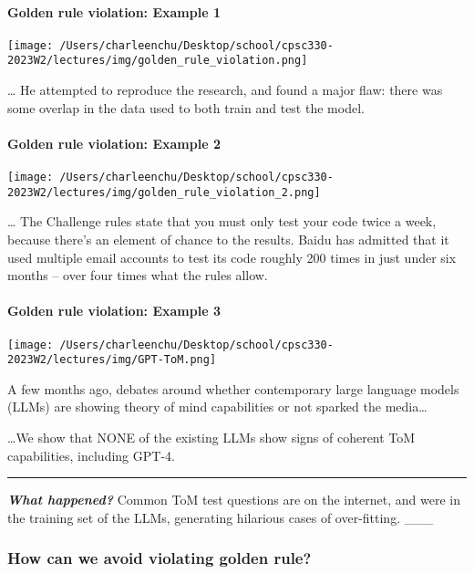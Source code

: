 \documentclass[11pt]{article}
\begin{document}
    \paragraph{Golden rule violation: Example
1}\label{golden-rule-violation-example-1}

\texttt{[image: /Users/charleenchu/Desktop/school/cpsc330-2023W2/lectures/img/golden\_rule\_violation.png]}

\ldots{} He attempted to reproduce the research, and found a major flaw:
there was some overlap in the data used to both train and test the
model.

    \paragraph{Golden rule violation: Example
2}\label{golden-rule-violation-example-2}

\texttt{[image: /Users/charleenchu/Desktop/school/cpsc330-2023W2/lectures/img/golden\_rule\_violation\_2.png]}

\ldots{} The Challenge rules state that you must only test your code
twice a week, because there's an element of chance to the results. Baidu
has admitted that it used multiple email accounts to test its code
roughly 200 times in just under six months -- over four times what the
rules allow.

    \paragraph{Golden rule violation: Example
3}\label{golden-rule-violation-example-3}

\texttt{[image: /Users/charleenchu/Desktop/school/cpsc330-2023W2/lectures/img/GPT-ToM.png]}

A few months ago, debates around whether contemporary large language
models (LLMs) are showing theory of mind capabilities or not sparked the
media\ldots{}

\ldots We show that NONE of the existing LLMs show signs of coherent ToM
capabilities, including GPT-4.

\begin{center}\rule{0.5\linewidth}{0.5pt}\end{center}

\textbf{\emph{What happened?}} Common ToM test questions are on the
internet, and were in the training set of the LLMs, generating hilarious
cases of over-fitting. \_\_\_

    \subsubsection{How can we avoid violating golden
rule?}\label{how-can-we-avoid-violating-golden-rule}
\end{document}
